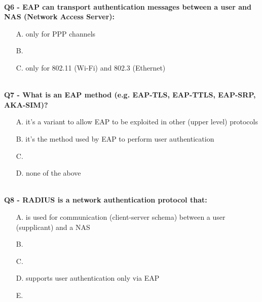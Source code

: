 \textbf{\\Q6 - EAP can transport authentication messages between a user and NAS (Network Access Server):}
\begin{itemize}
    \item[A.] only for PPP channels
    \item[B.] 
    \item[C.] only for 802.11 (Wi-Fi) and 802.3 (Ethernet)
\end{itemize}



\textbf{\\Q7 - What is an EAP method (e.g. EAP-TLS, EAP-TTLS, EAP-SRP, AKA-SIM)?}
\begin{itemize}
    \item[A.] it's a variant to allow EAP to be exploited in other (upper level) protocols
    \item[B.] it's the method used by EAP to perform user authentication
    \item[C.] 
    \item[D.] none of the above
\end{itemize}
\com{}

\textbf{\\Q8 - RADIUS is a network authentication protocol that:}
\begin{itemize}
    \item[A.] is used for communication (client-server schema) between a user (supplicant) and a NAS
    \item[B.] 
    \item[C.] 
    \item[D.] supports user authentication only via EAP
    \item[E.] 
\end{itemize}

